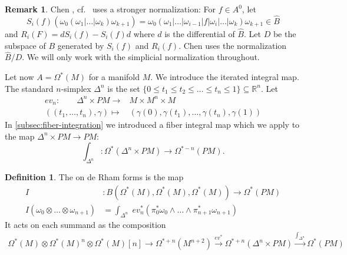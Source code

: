 \documentclass{scrartcl}
\let\emph\relax
\theoremstyle{plain}
\theoremstyle{definition}
\newtheorem{definition}[theorem]{Definition}
\newtheorem{remark}[theorem]{Remark}
\newcommand{\R}{\mathbb R}
\newcommand{\abs}[1]{\left\lvert#1\right\rvert}
\renewcommand{\subset}{\subseteq}
\let\xto\xrightarrow
\begin{document}
\begin{remark}
Chen \cite{chen1976reduced}, cf.\ \cite{getzler1991differential} uses a stronger normalization: For $f\in A^0$, let $$S_i(f)\left(\omega_0(\omega_1| \dots| \omega_k)\omega_{k+1}\right) = \omega_0(\omega_1| \dots |\omega_{i-1}| f | \omega_i| \dots| \omega_k)\omega_{k+1}\in \hat B$$ and $R_i(F) = d S_i(f) - S_i(f) d$ where $d$ is the differential of $\hat B$. Let $D$ be the subspace of $B$ generated by $S_i(f)$ and $R_i(f)$. Chen uses the normalization $\hat B/D$. We will only work with the simplicial normalization throughout. 
\end{remark}

Let now $A=\Omega^*(M)$ for a manifold $M$. We introduce the iterated integral map. The standard $n$-simplex $\Delta^n$ is the set $\{0\leq t_1\leq t_2\leq \dots\leq t_n\leq 1\} \subset \R^n$. Let 
\begin{align*}
    ev_n\colon\qquad\Delta^n\times PM \to & M\times M^n\times M \\
    ((t_1,\dots, t_n), \gamma)\mapsto &(\gamma(0), \gamma(t_1), \dots, \gamma(t_n), \gamma(1))
\end{align*}
In \cref{subsec:fiber-integration} we introduced a fiber integral map which we apply to the map $\Delta^n \times PM \to PM$: 
$$\int_{\Delta^n}\colon \Omega^*(\Delta^n \times PM) \to \Omega^{*-n}(PM).$$

\begin{definition}
The \emph{iterated integral} on de Rham forms is the map 
\begin{align*}
    I&\colon B(\Omega^*(M), \Omega^*(M), \Omega^*(M)) \to \Omega^*(PM) \\
    I(\omega_0 \otimes \dots \otimes\omega_{n+1}) &= \int_{\Delta^n}\phantom{|} ev_n^*(\pi_0^*\omega_0\wedge\dots\wedge\pi_{n+1}^*\omega_{n+1})
\end{align*}
It acts on each summand as the composition
\begin{align*}
    \Omega^*(M)\otimes\Omega^*(M)^n\otimes\Omega^*(M)[n]\to \Omega^{*+n}(M^{n+2})\xto{ev^*}\Omega^{*+n}(\Delta^n\times PM) \xto{\int_{\Delta^n}} \Omega^{*}(PM)
\end{align*}
\end{definition}
\end{document}
